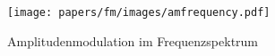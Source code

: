 
\begin{figure}
\centering
\texttt{[image: papers/fm/images/amfrequency.pdf]}
%
\caption{Amplitudenmodulation im Frequenzspektrum}
\label{fig:AM_frequency}
\end{figure}

